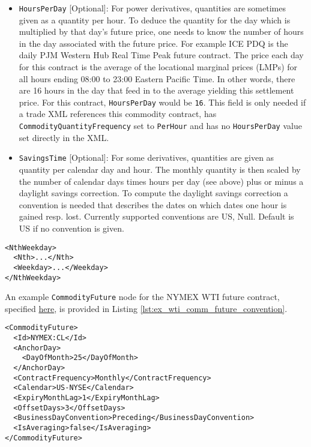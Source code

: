 \begin{itemize}
\item \lstinline!HoursPerDay! [Optional]: For power derivatives, quantities are sometimes given as a quantity per hour. To deduce the quantity for the day which is multiplied by that day's future price, one needs to know the number of hours in the day associated with the future price. For example ICE PDQ is the daily PJM Western Hub Real Time Peak future contract. The price each day for this contract is the average of the locational marginal prices (LMPs) for all hours ending 08:00 to 23:00 Eastern Pacific Time. In other words, there are 16 hours in the day that feed in to the average yielding this settlement price. For this contract, \lstinline!HoursPerDay! would be \lstinline!16!. This field is only needed if a trade XML references this commodity contract, has \lstinline!CommodityQuantityFrequency! set to \lstinline!PerHour! and has no \lstinline!HoursPerDay! value set directly in the XML.
\item \lstinline!SavingsTime! [Optional]: For some derivatives, quantities are given as quantity per calendar day and hour. The monthly quantity is then scaled by the number of calendar days times hours per day (see above) plus or minus a daylight savings correction. To compute the daylight savings correction a convention is needed that describes the dates on which dates one hour is gained resp. lost. Currently supported conventions are US, Null. Default is US if no convention is given. 
\end{itemize}

\begin{listing}[h!]
\begin{verbatim}
<NthWeekday>
  <Nth>...</Nth>
  <Weekday>...</Weekday>
</NthWeekday>
\end{verbatim}
\caption{\textnormal{\lstinline!NthWeekday!} node outline}
\label{lst:nth_weekday_node}
\end{listing}

An example \lstinline!CommodityFuture! node for the NYMEX WTI future contract, specified \href{https://www.cmegroup.com/trading/energy/crude-oil/light-sweet-crude_contract_specifications.html}{here}, is provided in Listing \ref{lst:ex_wti_comm_future_convention}.

\begin{listing}[h!]
\begin{verbatim}
<CommodityFuture>
  <Id>NYMEX:CL</Id>
  <AnchorDay>
    <DayOfMonth>25</DayOfMonth>
  </AnchorDay>
  <ContractFrequency>Monthly</ContractFrequency>
  <Calendar>US-NYSE</Calendar>
  <ExpiryMonthLag>1</ExpiryMonthLag>
  <OffsetDays>3</OffsetDays>
  <BusinessDayConvention>Preceding</BusinessDayConvention>
  <IsAveraging>false</IsAveraging>
</CommodityFuture>
\end{verbatim}
\caption{NYMEX WTI \textnormal{\lstinline!CommodityFuture!} node}
\label{lst:ex_wti_comm_future_convention}
\end{listing}

